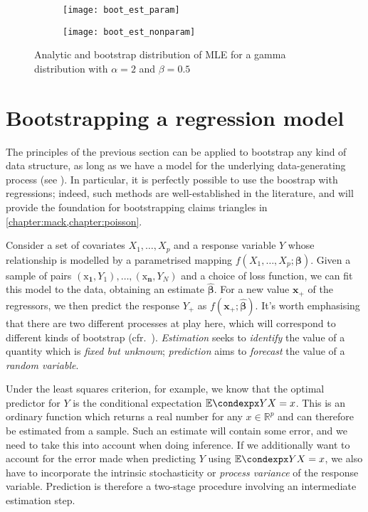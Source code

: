 \documentclass[a4paper]{book}
\begin{document}
\begin{landscape}
  \begin{figure}
    \begin{subfigure}{\linewidth}
      \texttt{[image: boot\_est\_param]}
    \end{subfigure}
    \begin{subfigure}{\linewidth}
      \texttt{[image: boot\_est\_nonparam]}
    \end{subfigure}
    \caption{Analytic and bootstrap distribution of MLE for a gamma distribution with $\alpha = 2$ and $\beta = 0.5$}
    \label{fig:boot-est}
  \end{figure}
\end{landscape}

\section{Bootstrapping a regression model} \label{sec:boot-reg}

The principles of the previous section can be applied to bootstrap any kind of data structure, as long as we have a model for the underlying data-generating process (see \cite[Chapter 8]{efron:intro}). In particular, it is perfectly possible to use the boostrap with regressions; indeed, such methods are well-established in the literature, and will provide the foundation for bootstrapping claims triangles in \cref{chapter:mack,chapter:poisson}.

Consider a set of covariates $X_1, \dots, X_p$ and a response variable $Y$ whose relationship is modelled by a parametrised mapping $f(X_1, \dots, X_p; \bm{\beta})$. Given a sample of pairs $(\bm{\mathrm{x}_1}, Y_1), \dots, (\bm{\mathrm{x}_n}, Y_N)$ and a choice of loss function, we can fit this model to the data, obtaining an estimate $\widehat{\bm{\beta}}$. For a new value $\mathbf{x_+}$ of the regressors, we then predict the response $Y_+$ as $f(\mathbf{x_+}; \widehat{\bm{\beta}})$. It's worth emphasising that there are two different processes at play here, which will correspond to different kinds of bootstrap (cfr.\ \cite[Sections 6.3.3 and 7.2.4]{davison}). \emph{Estimation} seeks to \emph{identify} the value of a quantity which is \emph{fixed but unknown}; \emph{prediction} aims to \emph{forecast} the value of a \emph{random variable}.

Under the least squares criterion, for example, we know that the optimal predictor for $Y$ is the conditional expectation $\condexp{Y}{X = x}$. This is an ordinary function which returns a real number for any $x \in \mathbb{R}^p$ and can therefore be estimated from a sample. Such an estimate will contain some error, and we need to take this into account when doing inference. If we additionally want to account for the error made when predicting $Y$ using $\condexp{Y}{X = x}$, we also have to incorporate the intrinsic stochasticity or \emph{process variance} of the response variable. Prediction is therefore a two-stage procedure involving an intermediate estimation step.
\end{document}
